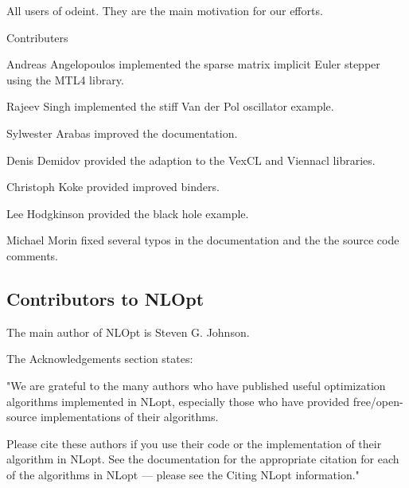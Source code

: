 All users of odeint. They are the main motivation for our efforts. 

\vpara
 Contributers 

Andreas Angelopoulos implemented the sparse matrix implicit Euler stepper using the MTL4 library. 

Rajeev Singh implemented the stiff Van der Pol oscillator example. 

Sylwester Arabas improved the documentation. 

Denis Demidov provided the adaption to the VexCL and Viennacl libraries. 

Christoph Koke provided improved binders. 

Lee Hodgkinson provided the black hole example. 

Michael Morin fixed several typos in the documentation and the the source code comments. 

  





\subsection{Contributors to NLOpt}
\label{Contributors to NLOpt}
The main author of NLOpt is Steven G. Johnson.

\vpara
The Acknowledgements section states:

\vpara
"We are grateful to the many authors who have published useful optimization algorithms implemented in NLopt, especially those who have provided free/open-source implementations of their algorithms. 

\vpara
Please cite these authors if you use their code or the implementation of their algorithm in NLopt. See the documentation for the appropriate citation for each of the algorithms in NLopt — please see the Citing NLopt information."








